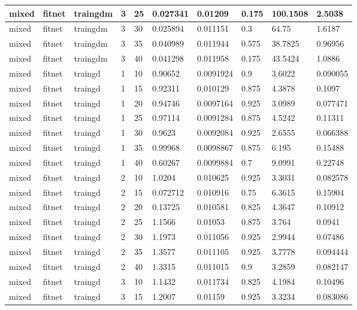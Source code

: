 \begin{longtable}{lllllllll}
mixed & fitnet & traingdm & 3 & 25 & 0.027341 & 0.01209 & 0.175 & 100.1508 & 2.5038 \\ \hline 
mixed & fitnet & traingdm & 3 & 30 & 0.025894 & 0.011151 & 0.3 & 64.75 & 1.6187 \\ \hline 
mixed & fitnet & traingdm & 3 & 35 & 0.040989 & 0.011944 & 0.575 & 38.7825 & 0.96956 \\ \hline 
mixed & fitnet & traingdm & 3 & 40 & 0.041298 & 0.011958 & 0.175 & 43.5424 & 1.0886 \\ \hline 
mixed & fitnet & traingd & 1 & 10 & 0.90652 & 0.0091924 & 0.9 & 3.6022 & 0.090055 \\ \hline 
mixed & fitnet & traingd & 1 & 15 & 0.92311 & 0.010129 & 0.875 & 4.3878 & 0.1097 \\ \hline 
mixed & fitnet & traingd & 1 & 20 & 0.94746 & 0.0097164 & 0.925 & 3.0989 & 0.077471 \\ \hline 
mixed & fitnet & traingd & 1 & 25 & 0.97114 & 0.0091284 & 0.875 & 4.5242 & 0.11311 \\ \hline 
mixed & fitnet & traingd & 1 & 30 & 0.9623 & 0.0092084 & 0.925 & 2.6555 & 0.066388 \\ \hline 
mixed & fitnet & traingd & 1 & 35 & 0.99968 & 0.0098867 & 0.875 & 6.195 & 0.15488 \\ \hline 
mixed & fitnet & traingd & 1 & 40 & 0.60267 & 0.0099884 & 0.7 & 9.0991 & 0.22748 \\ \hline 
mixed & fitnet & traingd & 2 & 10 & 1.0204 & 0.010625 & 0.925 & 3.3031 & 0.082578 \\ \hline 
mixed & fitnet & traingd & 2 & 15 & 0.072712 & 0.010916 & 0.75 & 6.3615 & 0.15904 \\ \hline 
mixed & fitnet & traingd & 2 & 20 & 0.13725 & 0.010581 & 0.825 & 4.3647 & 0.10912 \\ \hline 
mixed & fitnet & traingd & 2 & 25 & 1.1566 & 0.01053 & 0.875 & 3.764 & 0.0941 \\ \hline 
mixed & fitnet & traingd & 2 & 30 & 1.1973 & 0.011056 & 0.925 & 2.9944 & 0.07486 \\ \hline 
mixed & fitnet & traingd & 2 & 35 & 1.3577 & 0.011105 & 0.925 & 3.7778 & 0.094444 \\ \hline 
mixed & fitnet & traingd & 2 & 40 & 1.3315 & 0.011015 & 0.9 & 3.2859 & 0.082147 \\ \hline 
mixed & fitnet & traingd & 3 & 10 & 1.1432 & 0.011734 & 0.825 & 4.1984 & 0.10496 \\ \hline 
mixed & fitnet & traingd & 3 & 15 & 1.2007 & 0.01159 & 0.925 & 3.3234 & 0.083086 \\ \hline 

\end{longtable}
